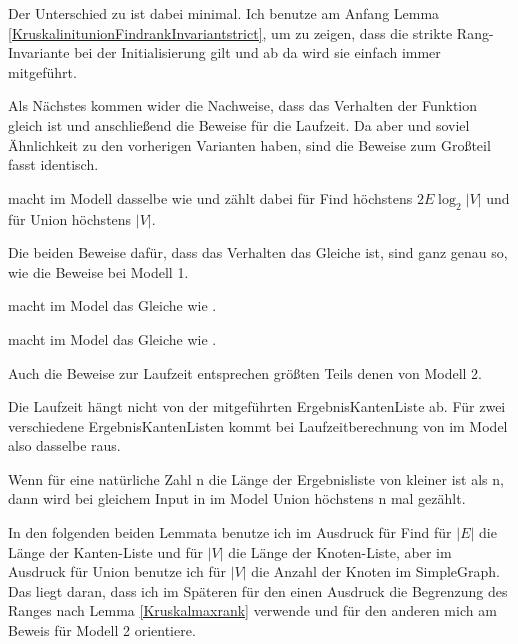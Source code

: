Der Unterschied zu \Kruskalkruskalprog ist dabei minimal.
Ich benutze am Anfang Lemma \ref{KruskalinitunionFindrankInvariantstrict}, um zu zeigen, dass die strikte Rang-Invariante bei der Initialisierung gilt und ab da wird sie einfach immer mitgeführt.

Als Nächstes kommen wider die Nachweise, dass das Verhalten der Funktion gleich ist und anschließend die Beweise für die Laufzeit.
Da aber \Kruskalkruskalprogstrict und \Kruskalkruskalmodelthree soviel Ähnlichkeit zu den vorherigen Varianten haben, sind die Beweise zum Großteil fasst identisch.

\begin{theorem}
  \Kruskalkruskalprogstrict macht im Modell \Kruskalkruskalmodelthree dasselbe wie \Kruskalkruskal und zählt dabei für Find höchstens $2E\log_2|V|$ und für Union höchstens $|V|$.
\end{theorem}

Die beiden Beweise dafür, dass das Verhalten das Gleiche ist, sind ganz genau so, wie die Beweise bei Modell 1.

\begin{lemma}[\Kruskalkruskalhelperevalthree]
  \Kruskalkruskalhelperprogstrict macht im Model \Kruskalkruskalmodelthree das Gleiche wie \Kruskalkruskalhelper.
\end{lemma}
\begin{lemma}[\Kruskalkruskalevalthree]
  \Kruskalkruskalprogstrict macht im Model \Kruskalkruskalmodelthree das Gleiche wie \Kruskalkruskal.
\end{lemma}

Auch die Beweise zur Laufzeit entsprechen größten Teils denen von Modell 2.

\begin{lemma}[\KruskalkruskalhelpertimethreeindependentedgesSoFar]
  Die Laufzeit hängt nicht von der mitgeführten ErgebnisKantenListe ab.
  Für zwei verschiedene ErgebnisKantenListen kommt bei Laufzeitberechnung von \Kruskalkruskalhelperprogstrict im Model \Kruskalkruskalmodelthree also dasselbe raus.
\end{lemma}
\begin{lemma}[\Kruskalkruskalhelpertimethreeright]
  Wenn für eine natürliche Zahl n die Länge der Ergebnisliste von \Kruskalkruskalhelper kleiner ist als n,
  dann wird bei gleichem Input in \Kruskalkruskalhelperprogstrict im Model \Kruskalkruskalmodelthree Union höchstens n mal gezählt.
\end{lemma}

In den folgenden beiden Lemmata benutze ich im Ausdruck für Find für $|E|$ die Länge der Kanten-Liste und für $|V|$ die Länge der Knoten-Liste,
aber im Ausdruck für Union benutze ich für $|V|$ die Anzahl der Knoten im SimpleGraph.
Das liegt daran, dass ich im Späteren für den einen Ausdruck die Begrenzung des Ranges nach Lemma \ref{Kruskalmaxrank} verwende und für den anderen mich am Beweis für Modell 2 orientiere.

